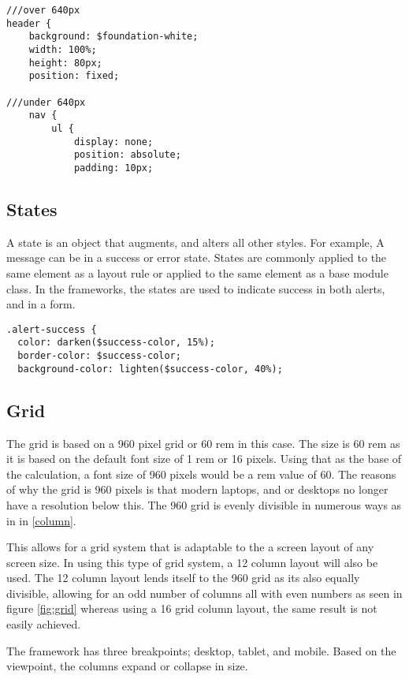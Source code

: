 \begin{lstlisting}[language=CSS3]
///over 640px
header {
	background: $foundation-white;
	width: 100%;
	height: 80px;
	position: fixed; 
	
///under 640px			
	nav {
		ul {
			display: none;
			position: absolute;
			padding: 10px;
\end{lstlisting}

\subsection*{States}
A state is an object that augments, and alters all other styles. For example, A message can be in a success or error state. States are commonly applied to the same element as a layout rule or applied to the same element as a base module class. In the frameworks, the states are used to indicate success in both alerts, and in a form. 

\begin{lstlisting}[language=CSS3]
.alert-success {
  color: darken($success-color, 15%);
  border-color: $success-color;
  background-color: lighten($success-color, 40%);
\end{lstlisting}

\newpage
\subsection*{Grid}

The grid is based on a 960 pixel grid or 60 rem in this case. The size is 60 rem as it is based on the default font size of 1 rem or 16 pixels. Using that as the base of the calculation, a font size of 960 pixels would be a rem value of 60. The reasons of why the grid is 960 pixels is that modern laptops, and or desktops no longer have a resolution below this. The 960 grid is evenly divisible in numerous ways as in in \ref{column}. 

This allows for a grid system that is adaptable to the a screen layout of any screen size. In using this type of grid system, a 12 column layout will also be used. The 12 column layout lends itself to the 960 grid as its also equally divisible, allowing for an odd number of columns all with even numbers as seen in figure \ref{fig:grid} whereas using a 16 grid column layout, the same result is not easily achieved. 

The framework has three breakpoints; desktop, tablet, and mobile. Based on the viewpoint, the columns expand or collapse in size. 

